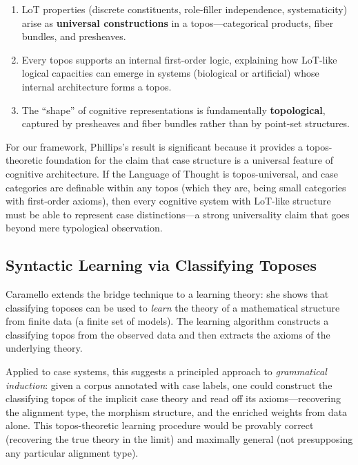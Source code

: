 \documentclass[
]{article}
\numberwithin{equation}{section}
\begin{document}
\begin{enumerate}
\def\labelenumi{\arabic{enumi}.}
\item
  LoT properties (discrete constituents, role-filler independence,
  systematicity) arise as \textbf{universal constructions} in a
  topos---categorical products, fiber bundles, and presheaves.
\item
  Every topos supports an internal first-order logic, explaining how
  LoT-like logical capacities can emerge in systems (biological or
  artificial) whose internal architecture forms a topos.
\item
  The ``shape'' of cognitive representations is fundamentally
  \textbf{topological}, captured by presheaves and fiber bundles rather
  than by point-set structures.
\end{enumerate}

For our framework, Phillips's result is significant because it provides
a topos-theoretic foundation for the claim that case structure is a
universal feature of cognitive architecture. If the Language of Thought
is topos-universal, and case categories are definable within any topos
(which they are, being small categories with first-order axioms), then
every cognitive system with LoT-like structure must be able to represent
case distinctions---a strong universality claim that goes beyond mere
typological observation.

\subsection{Syntactic Learning via Classifying
Toposes}\label{syntactic-learning-via-classifying-toposes}

Caramello \citeyearpar{caramello2023syntactic} extends the bridge
technique to a learning theory: she shows that classifying toposes can
be used to \emph{learn} the theory of a mathematical structure from
finite data (a finite set of models). The learning algorithm constructs
a classifying topos from the observed data and then extracts the axioms
of the underlying theory.

Applied to case systems, this suggests a principled approach to
\emph{grammatical induction}: given a corpus annotated with case labels,
one could construct the classifying topos of the implicit case theory
and read off its axioms---recovering the alignment type, the morphism
structure, and the enriched weights from data alone. This
topos-theoretic learning procedure would be provably correct (recovering
the true theory in the limit) and maximally general (not presupposing
any particular alignment type).
\end{document}
